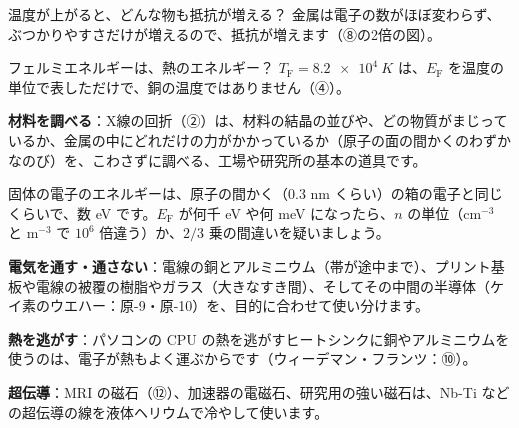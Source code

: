 \begin{tsumazuki}{温度が上がると、どんな物も抵抗が増える？}
金属は電子の数がほぼ変わらず、ぶつかりやすさだけが増えるので、抵抗が増えます（⑧の2倍の図）。
\end{tsumazuki}

\begin{tsumazuki}{フェルミエネルギーは、熱のエネルギー？}
$T_{\mathrm F}=\qty{8.2e4}{K}$ は、$E_{\mathrm F}$ を温度の単位で表しただけで、銅の温度ではありません（④）。
\end{tsumazuki}

\begin{phkougaku}[帯とすき間を使い分ける]
\textbf{材料を調べる}：X線の回折（②）は、材料の結晶の並びや、どの物質がまじっているか、金属の中にどれだけの力がかかっているか（原子の面の間かくのわずかなのび）を、こわさずに調べる、工場や研究所の基本の道具です。

\begin{phketa}[固体の電子の数の目安]
固体の電子のエネルギーは、原子の間かく（0.3 nm くらい）の箱の電子と同じくらいで、数 eV です。$E_{\mathrm F}$ が何千 eV や何 meV になったら、$n$ の単位（cm$^{-3}$ と m$^{-3}$ で $10^6$ 倍違う）か、$2/3$ 乗の間違いを疑いましょう。
\end{phketa}

\textbf{電気を通す・通さない}：電線の銅とアルミニウム（帯が途中まで）、プリント基板や電線の被覆の樹脂やガラス（大きなすき間）、そしてその中間の半導体（ケイ素のウエハー：原-9・原-10）を、目的に合わせて使い分けます。

\textbf{熱を逃がす}：パソコンの CPU の熱を逃がすヒートシンクに銅やアルミニウムを使うのは、電子が熱もよく運ぶからです（ウィーデマン・フランツ：⑩）。

\textbf{超伝導}：MRI の磁石（⑫）、加速器の電磁石、研究用の強い磁石は、Nb-Ti などの超伝導の線を液体ヘリウムで冷やして使います。
\end{phkougaku}

